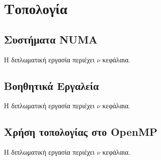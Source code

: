 \chapter{Τοπολογία}
\label{ch:Topology}


\section{Συστήματα NUMA}
\label{sec:NUMA Systems}
Η διπλωματική εργασία περιέχει $\nu$ κεφάλαια.

\section{Βοηθητικά Εργαλεία}
\label{sec:Utility Tools}
Η διπλωματική εργασία περιέχει $\nu$ κεφάλαια.

\section{Χρήση τοπολογίας στο OpenMP}
\label{sec:Topology in OpenMP}
Η διπλωματική εργασία περιέχει $\nu$ κεφάλαια.
